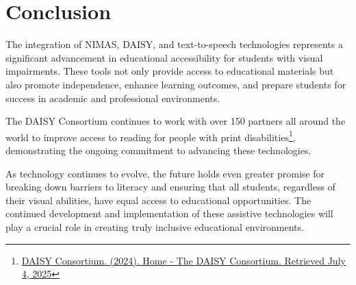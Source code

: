 \section{Conclusion}\label{conclusion}

The integration of NIMAS, DAISY, and text-to-speech technologies represents a significant advancement in educational accessibility for students with visual impairments. These tools not only provide access to educational materials but also promote independence, enhance learning outcomes, and prepare students for success in academic and professional environments.

The DAISY Consortium continues to work with over 150 partners all around the world to improve access to reading for people with print disabilities\footnote{\href{https://daisy.org/}{DAISY Consortium. (2024). Home - The DAISY Consortium. Retrieved July 4, 2025}}, demonstrating the ongoing commitment to advancing these technologies.

As technology continues to evolve, the future holds even greater promise for breaking down barriers to literacy and ensuring that all students, regardless of their visual abilities, have equal access to educational opportunities. The continued development and implementation of these assistive technologies will play a crucial role in creating truly inclusive educational environments.
